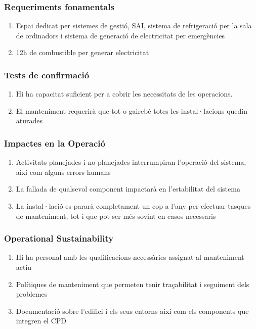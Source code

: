 \documentclass[11pt,a4paper,titlepage]{article}
\begin{document}
    \subsubsection{Requeriments fonamentals}
    \begin{enumerate}[nolistsep, label=\alph*.]
    \item Espai dedicat per sistemes de gestió, SAI, sistema de refrigeració per la sala de ordinadors i sistema de generació de electricitat per emergències
    \item 12h de combustible per generar electricitat
    \end{enumerate}
    
    \subsubsection{Tests de confirmació}
    \begin{enumerate}[nolistsep, label=\alph*.]
    \item Hi ha capacitat suficient per a cobrir les necessitats de les operacions.
    \item El manteniment requerirà que tot o gairebé totes les instal·lacions quedin aturades
    \end{enumerate}
    
    \subsubsection{Impactes en la Operació}
    \begin{enumerate}[nolistsep, label=\alph*.]
    \item Activitats planejades i no planejades interrumpiran l'operació del sistema, així com alguns errors humans
    \item La fallada de qualsevol component impactarà en l'estabilitat del sistema
    \item La instal·lació es pararà completament un cop a l'any per efectuar tasques de manteniment, tot i que pot ser més sovint en casos necessaris
    \end{enumerate}
    
    \subsubsection{Operational Sustainability}
    \begin{enumerate}[nolistsep, label=\alph*.]
    \item Hi ha personal amb les qualificacions necessàries assignat al manteniment actiu
    \item Polítiques de manteniment que permeten tenir traçabilitat i seguiment dels problemes
    \item Documentació sobre l'edifici i els seus entorns així com els components que integren el CPD
    \end{enumerate}
    
\end{document}

